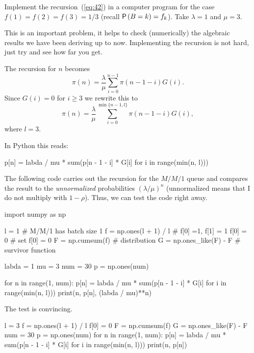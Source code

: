 \begin{exercise}{\faCalculator}
  Implement the recursion~(\ref{eq:42}) in a computer program for the
  case $f(1)=f(2)=f(3)=1/3$ (recall $\P{B=k} =f_k$). Take $\lambda =1$
  and $\mu = 3$.  
  \begin{hint}
This is an important problem, it helps to check (numerically)
    the algebraic results we have been deriving up to
    now. Implementing the recursion is not hard, just try and see how
    far you get.
  \end{hint}
  \begin{solution}
The recursion for $n$ becomes 
\begin{equation*}
\pi(n) = \frac \lambda \mu \sum_{i=0}^{n-1} \pi(n-1-i)G(i).
\end{equation*}
Since $G(i) =0$ for $i\geq 3$ we rewrite this to 
\begin{equation*}
  \pi(n) = \frac\lambda \mu \sum_{i=0}^{\min\{n-1,l\}} \pi(n-1-i)G(i),
\end{equation*}
where $l=3$. 

In Python this reads:

\begin{pyverbatim}
p[n] = labda / mu * sum(p[n - 1 - i] * G[i] for i in range(min(n, l)))
\end{pyverbatim}

The following code carries out the recursion for the $M/M/1$ queue and compares the result to the \emph{unnormalized} probabilities $(\lambda/\mu)^n$ (unnormalized means that I do  not multiply with $1-\rho$). Thus, we can test the code right away. 

\begin{pyconsole}
import numpy as np

l = 1 # M/M/1 has batch size 1
f = np.ones(l + 1) / l # f[0] =1, f[1] = 1 
f[0] = 0 # set f[0] = 0
F = np.cumsum(f) # distribution 
G = np.ones_like(F) - F # survivor function

labda = 1
mu = 3
num = 30
p = np.ones(num)

for n in range(1, num):
    p[n] = labda / mu * sum(p[n - 1 - i] * G[i] for i in range(min(n, l)))
    print(n, p[n], (labda / mu)**n)

\end{pyconsole}
The test is convincing.

\begin{pyconsole}
l = 3
f = np.ones(l + 1) / l
f[0] = 0
F = np.cumsum(f)
G = np.ones_like(F) - F
num = 30
p = np.ones(num)
for n in range(1, num):
    p[n] = labda / mu * sum(p[n - 1 - i] * G[i] for i in range(min(n, l)))
    print(n, p[n])


\end{pyconsole}
\end{solution}
\end{exercise}
